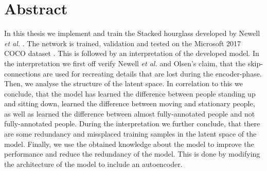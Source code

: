 \documentclass[./main.tex]{subfiles}
\begin{document}
\section{Abstract}
In this thesis we implement and train the Stacked hourglass developed by Newell \textit{et al.} \cite{Newell}. The network is trained, validation and tested on the Microsoft 2017 COCO dataset \cite{COCO_article}. This is followed by an interpretation of the developed model. In the interpretation we first off verify Newell \textit{et al.} \cite{Newell} and Olsen's \cite{Camilla} claim, that the skip-connections are used for recreating details that are lost during the encoder-phase. Then, we analyse the structure of the latent space. In correlation to this we conclude, that the model has learned the difference between people standing up and sitting down, learned the difference between moving and stationary people, as well as learned the difference between almost fully-annotated people and not fully-annotated people. During the interpretation we further conclude, that there are some redundancy and missplaced training samples in the latent space of the model. Finally, we use the obtained knowledge about the model to improve the performance and reduce the redundancy of the model. This is done by modifying the architecture of the model to include an autoencoder. 
\end{document}
